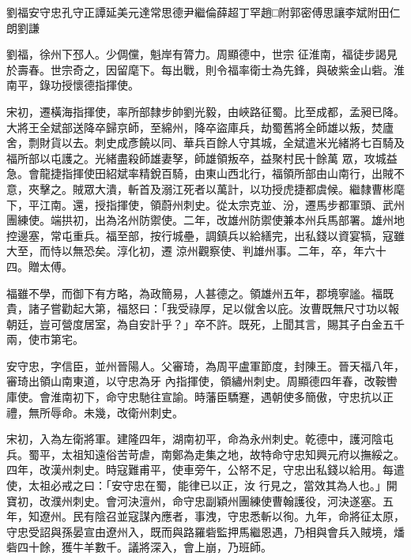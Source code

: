 
\begin{pinyinscope}

 劉福安守忠孔守正譚延美元達常思德尹繼倫薛超丁罕趙□附郭密傅思讓李斌附田仁朗劉謙



 劉福，徐州下邳人。少倜儻，魁岸有膂力。周顯德中，世宗
 征淮南，福徒步謁見於壽春。世宗奇之，因留麾下。每出戰，則令福率衛士為先鋒，與破紫金山砦。淮南平，錄功授懷德指揮使。



 宋初，遷橫海指揮使，率所部隸步帥劉光毅，由峽路征蜀。比至成都，孟昶已降。大將王全斌部送降卒歸京師，至綿州，降卒盜庫兵，劫蜀舊將全師雄以叛，焚廬舍，剽財貨以去。刺史成彥饒以同、華兵百餘人守其城，全斌遣米光緒將七百騎及福所部以屯護之。光緒盡殺師雄妻孥，師雄領叛卒，益聚村民十餘萬
 眾，攻城益急。會龍捷指揮使田紹斌率精銳百騎，由東山西北行，福領所部由山南行，出賊不意，夾擊之。賊眾大潰，斬首及溺江死者以萬計，以功授虎捷都虞候。繼隸曹彬麾下，平江南。還，授指揮使，領蔚州刺史。從太宗克並、汾，遷馬步都軍頭、武州團練使。端拱初，出為洺州防禦使。二年，改雄州防禦使兼本州兵馬部署。雄州地控邊塞，常屯重兵。福至部，按行城壘，調鎮兵以給繕完，出私錢以資宴犒，寇雖大至，而恃以無恐矣。淳化初，遷
 涼州觀察使、判雄州事。二年，卒，年六十四。贈太傅。



 福雖不學，而御下有方略，為政簡易，人甚德之。領雄州五年，郡境寧謐。福既貴，諸子嘗勸起大第，福怒曰：「我受祿厚，足以僦舍以庇。汝曹既無尺寸功以報朝廷，豈可營度居室，為自安計乎？」卒不許。既死，上聞其言，賜其子白金五千兩，使市第宅。



 安守忠，字信臣，並州晉陽人。父審琦，為周平盧軍節度，封陳王。晉天福八年，審琦出領山南東道，以守忠為牙
 內指揮使，領繡州刺史。周顯德四年春，改鞍轡庫使。會淮南初下，命守忠馳往宣諭。時藩臣驕蹇，遇朝使多簡傲，守忠抗以正禮，無所辱命。未幾，改衛州刺史。



 宋初，入為左衛將軍。建隆四年，湖南初平，命為永州刺史。乾德中，護河陰屯兵。蜀平，太祖知遠俗苦苛虐，南鄭為走集之地，故特命守忠知興元府以撫綏之。四年，改漢州刺史。時寇難甫平，使車旁午，公帑不足，守忠出私錢以給用。每遣使，太祖必戒之曰：「安守忠在蜀，能律已以正，汝
 行見之，當效其為人也。」開寶初，改濮州刺史。會河決澶州，命守忠副穎州團練使曹翰護役，河決遂塞。五年，知遼州。民有陰召並寇謀內應者，事洩，守忠悉斬以徇。九年，命將征太原，守忠受詔與孫晏宣由遼州入，既而與路羅砦監押馬繼恩遇，乃相與會兵入賊境，燔砦四十餘，獲牛羊數千。議將深入，會上崩，乃班師。




\end{pinyinscope}
